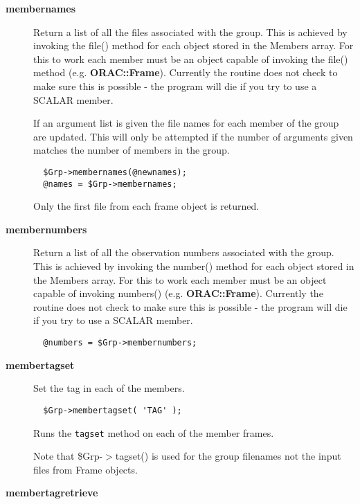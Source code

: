 \begin{description}
\item[{\textbf{membernames}}] \mbox{}

Return a list of all the files associated with the group. This is
achieved by invoking the file() method for each object stored in the
Members array.  For this to work each member must be an object capable
of invoking the file() method (e.g. \textbf{ORAC::Frame}). Currently the
routine does not check to make sure this is possible - the program
will die if you try to use a SCALAR member.



If an argument list is given the file names for each member of the
group are updated. This will only be attempted if the number of
arguments given matches the number of members in the group.

\begin{verbatim}
  $Grp->membernames(@newnames);
  @names = $Grp->membernames;
\end{verbatim}


Only the first file from each frame object is returned.


\item[{\textbf{membernumbers}}] \mbox{}

Return a list of all the observation numbers associated with
the group. This is achieved by invoking the number() method for
each object stored in the Members array.
For this to work each member must be an object capable of invoking
numbers() (e.g. \textbf{ORAC::Frame}). Currently the routine does not check
to make sure this is possible - the program will die if you try
to use a SCALAR member.

\begin{verbatim}
  @numbers = $Grp->membernumbers;
\end{verbatim}

\item[{\textbf{membertagset}}] \mbox{}

Set the tag in each of the members.

\begin{verbatim}
  $Grp->membertagset( 'TAG' );
\end{verbatim}


Runs the \texttt{tagset} method on each of the member frames.



Note that \$Grp-$>$tagset() is used for the group filenames
not the input files from Frame objects.


\item[{\textbf{membertagretrieve}}] \mbox{}


\end{description}
